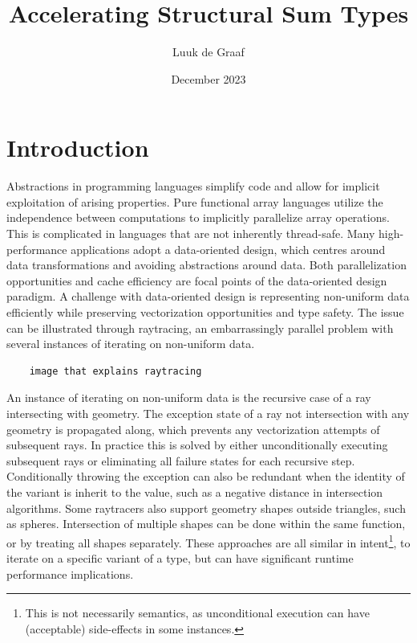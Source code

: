 \documentclass{article}
\title{Accelerating Structural Sum Types}
\author{Luuk de Graaf}
\date{December 2023}
\begin{document}
\maketitle

\tableofcontents

\newpage

\section{Introduction}

Abstractions in programming languages simplify code and allow for implicit exploitation of arising properties.
Pure functional array languages utilize the independence between computations to implicitly parallelize array operations.
This is complicated in languages that are not inherently thread-safe.
Many high-performance applications adopt a data-oriented design, which centres around data transformations and avoiding abstractions around data. 
Both parallelization opportunities and cache efficiency are focal points of the data-oriented design paradigm.
A challenge with data-oriented design is representing non-uniform data efficiently while preserving vectorization opportunities and type safety. 
The issue can be illustrated through raytracing, an embarrassingly parallel problem with several instances of iterating on non-uniform data.

\begin{verbatim}
    image that explains raytracing
\end{verbatim}

An instance of iterating on non-uniform data is the recursive case of a ray intersecting with geometry.
The exception state of a ray not intersection with any geometry is propagated along, which prevents any vectorization attempts of subsequent rays. 
In practice this is solved by either unconditionally executing subsequent rays or eliminating all failure states for each recursive step.
Conditionally throwing the exception can also be redundant when the identity of the variant is inherit to the value, such as a negative distance in intersection algorithms. 
Some raytracers also support geometry shapes outside triangles, such as spheres.
Intersection of multiple shapes can be done within the same function, or by treating all shapes separately.
These approaches are all similar in intent\footnote{This is not necessarily semantics, as unconditional execution can have (acceptable) side-effects in some instances.}, to iterate on a specific variant of a type, but can have significant runtime performance implications.
\end{document}
